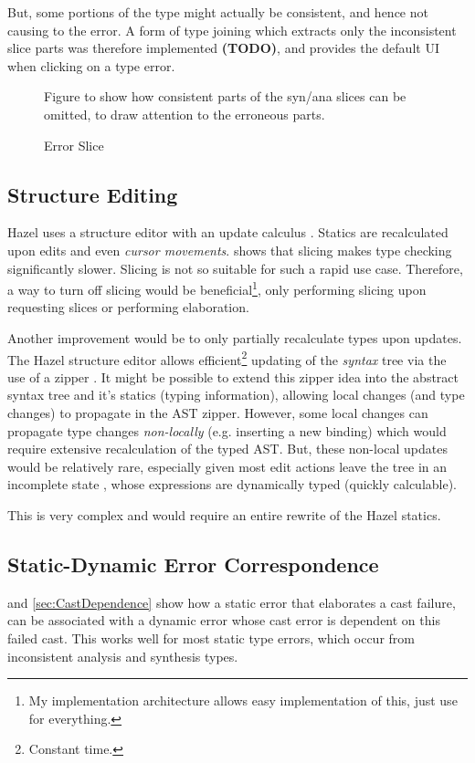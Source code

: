 But, some portions of the type might actually be consistent, and hence not causing to the error. A form of type joining which extracts only the inconsistent slice parts was therefore implemented \textbf{(TODO)}, and provides the default UI when clicking on a type error.

\begin{figure}
Figure to show how consistent parts of the syn/ana slices can be omitted, to draw attention to the erroneous parts.
\caption{Error Slice}
\end{figure}

\subsection{Structure Editing}\label{sec:StructureEditing}
Hazel uses a structure editor with an update calculus \cite{HazelStructureCalculus}. Statics are recalculated upon edits and even \textit{cursor movements}.  shows that slicing makes type checking significantly slower. Slicing is not so suitable for such a rapid use case. Therefore, a way to turn off slicing would be beneficial\footnote{My implementation architecture allows easy implementation of this, just use  for everything.}, only performing slicing upon requesting slices or performing elaboration.

Another improvement would be to only partially recalculate types upon updates. The Hazel structure editor allows efficient\footnote{Constant time.} updating of the \textit{syntax} tree via the use of a zipper \cite{HuetZipper, OneHoleContext}. It might be possible to extend this zipper idea into the abstract syntax tree and it's statics (typing information), allowing local changes (and type changes) to propagate in the AST zipper. However, some local changes can propagate type changes \textit{non-locally} (e.g. inserting a new binding) which would require extensive recalculation of the typed AST. But, these non-local updates would be relatively rare, especially given most edit actions leave the tree in an incomplete state \cite{IncompleteEditStates}, whose expressions are dynamically typed (quickly calculable). 

This is very complex and would require an entire rewrite of the Hazel statics.

  
\subsection{Static-Dynamic Error Correspondence}
 and \ref{sec:CastDependence} show how a static error that elaborates a cast failure, can be associated with a dynamic error whose cast error is dependent on this failed cast. This works well for most static type errors, which occur from inconsistent analysis and synthesis types.

